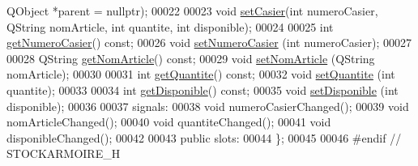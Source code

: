 \begin{DoxyCode}
      QObject *parent = \textcolor{keywordtype}{nullptr});
00022 
00023     \textcolor{keywordtype}{void} \hyperlink{class_casier_a140dc38c9e87815b2ce7fc6dce33080b}{setCasier}(\textcolor{keywordtype}{int} numeroCasier, QString nomArticle, \textcolor{keywordtype}{int} quantite, \textcolor{keywordtype}{int} disponible);
00024 
00025     \textcolor{keywordtype}{int} \hyperlink{class_casier_a77004d988048cf4c8ad521800745be73}{getNumeroCasier}() const;
00026     \textcolor{keywordtype}{void} \hyperlink{class_casier_a5ae4ea249ab63e1ad44af87fb019a6b0}{setNumeroCasier} (\textcolor{keywordtype}{int} numeroCasier);
00027 
00028     QString \hyperlink{class_casier_ad1e4ebd48218bc19d8e29e98b6a9e939}{getNomArticle}() const;
00029     \textcolor{keywordtype}{void} \hyperlink{class_casier_ab46ac6ac9c4fae70f9b8ef23f856fa52}{setNomArticle} (QString nomArticle);
00030 
00031     \textcolor{keywordtype}{int} \hyperlink{class_casier_ad4b3ee57fdc7240b2a895b7f70f4cd11}{getQuantite}() const;
00032     \textcolor{keywordtype}{void} \hyperlink{class_casier_a41aee5f476516dc87b66674c6b9c6d4b}{setQuantite} (\textcolor{keywordtype}{int} quantite);
00033 
00034     \textcolor{keywordtype}{int} \hyperlink{class_casier_a7d25b1a4bdbe4e600734cda8fb944258}{getDisponible}() const;
00035     \textcolor{keywordtype}{void} \hyperlink{class_casier_ac41e3c5e88e638c1375b35940c1870ed}{setDisponible} (\textcolor{keywordtype}{int} disponible);
00036 
00037 signals:
00038     \textcolor{keywordtype}{void} numeroCasierChanged();
00039     \textcolor{keywordtype}{void} nomArticleChanged();
00040     \textcolor{keywordtype}{void} quantiteChanged();
00041     \textcolor{keywordtype}{void} disponibleChanged();
00042 
00043 public slots:
00044 \};
00045 
00046 \textcolor{preprocessor}{#endif // STOCKARMOIRE\_H}
\end{DoxyCode}
